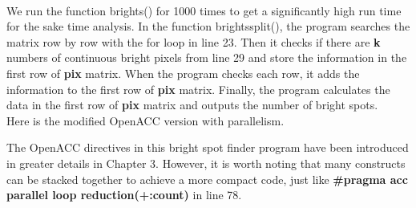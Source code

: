 \documentclass[ebook,10pt,oneside,openany]{memoir}
\begin{document}

\paragraph{}
We run the function brights() for 1000 times to get a significantly high run time for the sake time analysis. In the function brightssplit(), the program searches the matrix row by row with the for loop in line 23. Then it checks if there are \textbf{k} numbers of continuous bright pixels from line 29 and store the information in the first row of \textbf{pix} matrix. When the program checks each row, it adds the information to the first row of \textbf{pix} matrix. Finally, the program calculates the data in the first row of \textbf{pix} matrix and outputs the number of bright spots. \\

Here is the modified OpenACC version with parallelism.




The OpenACC directives in this bright spot finder program have been introduced in greater details in Chapter 3. However, it is worth noting that many constructs can be stacked together to achieve a more compact code, just like \textbf{\#pragma acc parallel loop reduction(+:count)} in line 78.
\end{document}
